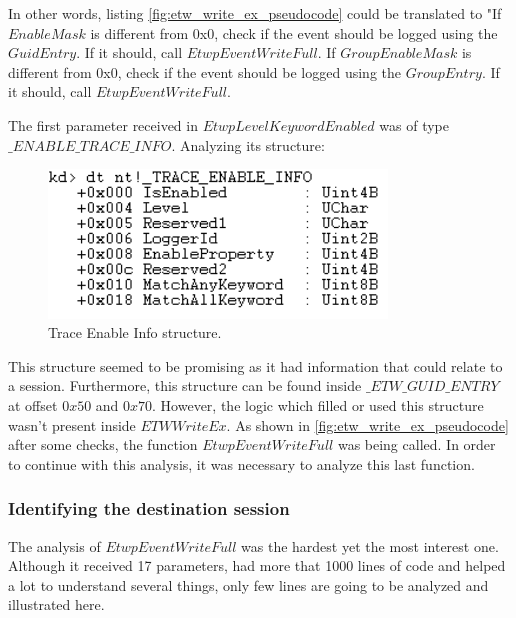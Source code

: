 In other words, listing \ref{fig:etw_write_ex_pseudocode} could be translated to "If $EnableMask$ is different from 0x0, check if the event should be logged using the $GuidEntry$. If it should, call $EtwpEventWriteFull$. If $GroupEnableMask$ is different from 0x0, check if the event should be logged using the $GroupEntry$. If it should, call $EtwpEventWriteFull$.


The first parameter received in $EtwpLevelKeywordEnabled$ was of type $\_ENABLE\_TRACE\_INFO$. Analyzing its structure: 

\begin{centering}
  \begin{figure}[H]
    \includegraphics[width=9cm]{images/trace_enable_info.png}
    \caption[]{Trace Enable Info structure.}
    \label{fig:trace_enable_info}
  \end{figure}
\end{centering}

This structure seemed to be promising as it had information that could relate to a session. Furthermore, this structure can be found inside $\_ETW\_GUID\_ENTRY$ at offset $0x50$ and $0x70$. However, the logic which filled or used this structure wasn't present inside $ETWWriteEx$. As shown in \ref{fig:etw_write_ex_pseudocode} after some checks, the function $EtwpEventWriteFull$ was being called. In order to continue with this analysis, it was necessary to analyze this last function. 




\subsubsection{\bfseries Identifying the destination session}

The analysis of $EtwpEventWriteFull$ was the hardest yet the most interest one. Although it received 17 parameters, had more that 1000 lines of code and helped a lot to understand several things, only few lines are going to be analyzed and illustrated here. 

